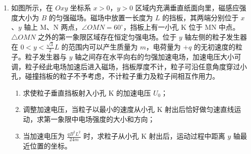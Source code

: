 \documentclass[\gkver]{gaokaozhenti}
\begin{document}
\begin{enumerate}
{当小物块运动到 P 点时，经过 $t_{0}$ 时间，则轨道有 $v_{1} = a_{1}t_{0}$

小物块有 $v_{2} = a_{2}t_{0}$

在这个过程中系统机械能守恒有

$\frac{1}{2}Mv_{1}^{2} + \frac{1}{2}mv_{2}^{2} = \frac{1}{2}Mv_{3}^{2} + \frac{1}{2}mv_{4}^{2} + 2mgR$

水平方向动量守恒，以水平向左为正方向，则有

$Mv_{1} + mv_{2} = Mv_{3} + mv_{4}$

联立解得 $t_{0} = 1.5 \Us$

根据运动学公式有 $L = \frac{1}{2}a_{1}t_{0}^{2} - \frac{1}{2}a_{2}t_{0}^{2}$

代入数据解得 $L = 4.5 \Um$。
}

\item
如图所示，在 $Oxy$ 坐标系 $x > 0$，$y > 0$ 区域内充满垂直纸面向里，磁感应强度大小为 $B$ 的匀强磁场。磁场中放置一长度为 $L$ 的挡板，其两端分别位于 $x$、$y$ 轴上 M、N 两点，$\angle OMN = 60^{\circ}$，挡板上有一小孔 K 位于 MN 中点。$\triangle OMN$ 之外的第一象限区域存在恒定匀强电场。位于 $y$ 轴左侧的粒子发生器在 $0 < y < \frac{\sqrt{3}}{2}L$ 的范围内可以产生质量为 $m$，电荷量为 $+q$ 的无初速度的粒子。粒子发生器与 $y$ 轴之间存在水平向右的匀强加速电场，加速电压大小可调，粒子经此电场加速后进入磁场，挡板厚度不计，粒子可沿任意角度穿过小孔，碰撞挡板的粒子不予考虑，不计粒子重力及粒子间相互作用力。
\begin{enumerate}
	\item
	求使粒子垂直挡板射入小孔 K 的加速电压 $U_{0}$；
	\item
	调整加速电压，当粒子以最小的速度从小孔 K 射出后恰好做匀速直线运动，求第一象限中电场强度的大小和方向；
	\item
	当加速电压为 $\frac{qB^{2}L^{2}}{24m}$ 时，求粒子从小孔 K 射出后，运动过程中距离 $y$ 轴最近位置的坐标。
\end{enumerate}
\end{enumerate}
\end{document}
